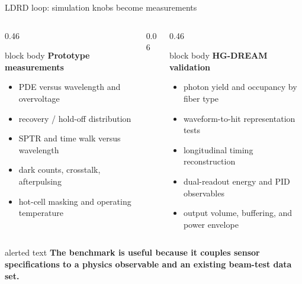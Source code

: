 \documentclass[10pt,aspectratio=169,t]{beamer}
\newcommand{\tightitem}{\setlength\itemsep{0.30em}\setlength\parskip{0pt}}
\begin{document}
\begin{frame}{LDRD loop: simulation knobs become measurements}
  \begin{columns}[T,onlytextwidth]
    \begin{column}{0.46\textwidth}
      \begin{beamercolorbox}[rounded=true,sep=0.24cm]{block body}
        \centering\bfseries Prototype measurements
      \end{beamercolorbox}
      \begin{itemize}\tightitem
        \item PDE versus wavelength and overvoltage
        \item recovery / hold-off distribution
        \item SPTR and time walk versus wavelength
        \item dark counts, crosstalk, afterpulsing
        \item hot-cell masking and operating temperature
      \end{itemize}
    \end{column}
    \begin{column}{0.06\textwidth}
      \centering\vspace{1.6cm}{\Large$\Longleftrightarrow$}
    \end{column}
    \begin{column}{0.46\textwidth}
      \begin{beamercolorbox}[rounded=true,sep=0.24cm]{block body}
        \centering\bfseries HG-DREAM validation
      \end{beamercolorbox}
      \begin{itemize}\tightitem
        \item photon yield and occupancy by fiber type
        \item waveform-to-hit representation tests
        \item longitudinal timing reconstruction
        \item dual-readout energy and PID observables
        \item output volume, buffering, and power envelope
      \end{itemize}
    \end{column}
  \end{columns}
  \vspace{0.16cm}
  \begin{beamercolorbox}[rounded=true,sep=0.18cm]{alerted text}
    \centering\normalsize\bfseries The benchmark is useful because it couples sensor specifications to a physics observable and an existing beam-test data set.
  \end{beamercolorbox}
\end{frame}
\end{document}

